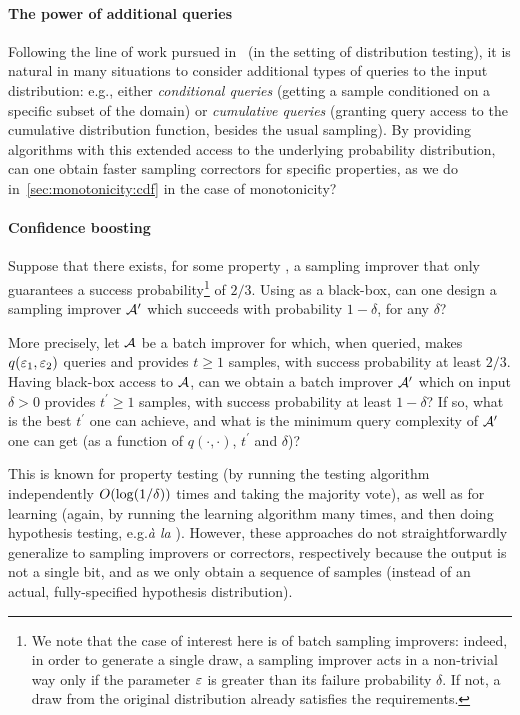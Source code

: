 \paragraph*{The power of additional queries}
Following the line of work pursued in~\cite{CFGM:13,CRS:14,CR:14} (in the setting of distribution testing), 
it is natural in many situations to consider additional types of queries to the input distribution: 
e.g., either \emph{conditional queries} 
(getting a sample conditioned on a specific subset of the domain) or \emph{cumulative queries} 
(granting query access to the cumulative distribution function, 
besides the usual sampling). 
By providing algorithms with this extended access to the underlying probability distribution, 
can one obtain faster sampling correctors for specific properties, as we {do} in~\autoref{sec:monotonicity:cdf} in the case of monotonicity?

\paragraph*{Confidence boosting}
Suppose that there exists, for some property \property, a sampling improver \Algo that only guarantees a success probability\footnote{We note that the case of interest here is of batch sampling improvers: indeed, in order to generate a single draw, a sampling improver acts in a non-trivial way only if the parameter $\varepsilon$ is greater than its failure probability $\delta$. If not, a draw from the original distribution already satisfies the requirements.} of $2/3$. Using \Algo as a black-box, can one design a sampling improver $\mathcal{A}^\prime$ which succeeds with probability $1-\delta$, for any $\delta$?

More precisely, let $\mathcal{A}$ be a batch improver for \property which, when queried, makes $q(\varepsilon_1,\varepsilon_2)$ queries and provides $t\geq 1$ samples, with success probability at least $2/3$. Having black-box access to $\mathcal{A}$, can we obtain a batch improver $\mathcal{A}^\prime$ which on input $\delta>0$ provides $t^\prime \geq 1$ samples, with success probability at least $1-\delta$? If so, what is the best $t^\prime$ one can achieve, and what is the minimum query complexity of $\mathcal{A}^\prime$ one can get (as a function of $q(\cdot,\cdot)$, $t^\prime$ and $\delta$)?

This is known for property testing (by running the testing algorithm independently $\bigO{\log(1/\delta)}$ times and taking the majority vote), 
as well as for learning (again, 
by running the learning algorithm many times, 
and then doing hypothesis testing, e.g.\xspace\emph{\`a la}  
\cite[Theorem 19]{DK:13}). 
However, these approaches do not straightforwardly 
generalize to sampling improvers or correctors, 
respectively because the output is not a single bit, 
and as we only obtain a sequence of samples (instead of an actual, 
fully-specified hypothesis distribution).
 

